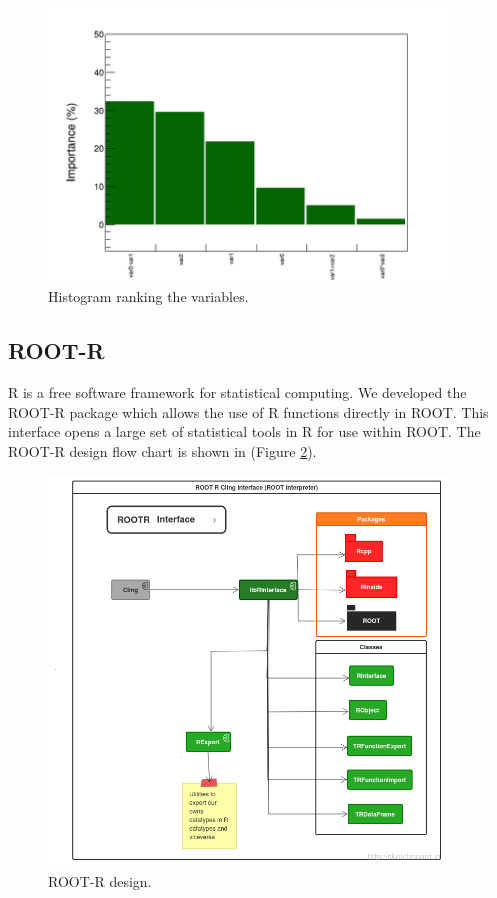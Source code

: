 \documentclass[a4paper]{jpconf}
\begin{document}
\begin{figure}[h]
\centering
\includegraphics[width=25pc]{img/vi.png}\caption{\label{vi} Histogram ranking the variables.}
\end{figure}



\subsection{ROOT-R}\label{ROOTR}


R  is a free software framework for statistical computing\cite{R}. We developed the ROOT-R package which allows the  use of R functions directly in ROOT. This interface opens a large set of statistical tools in R for use within ROOT. The ROOT-R design flow chart is shown in (Figure \ref{rootr:label}). 



\begin{figure}[h]
\centering
\includegraphics[width=25pc]{img/rootr.png}\caption{\label{rootr:label} ROOT-R design.}
\end{figure}
\end{document}
